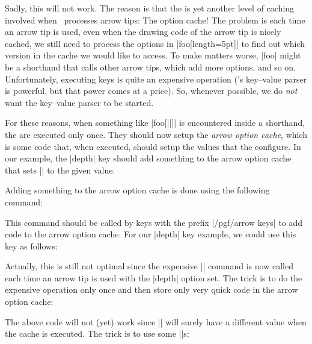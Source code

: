 Sadly, this will not work. The  reason is that the is
yet another level of caching involved when \pgfname\ processes arrow tips: The
option cache! The problem is each time an arrow tip is used, even when the
drawing code of the arrow tip is nicely cached, we still need to process the
options in |foo[length=5pt]| to find out which version in the cache we would
like to access. To make matters worse, |foo| might be a shorthand that calls
other arrow tips, which add more options, and so on. Unfortunately, executing
keys is quite an expensive operation (\pgfname's key--value parser is powerful,
but that power comes at a price). So, whenever possible, we do \emph{not} want
the key--value parser to be started.

For these reasons, when something like |foo[||]| is encountered
inside a shorthand, the  are executed only once. They should now
setup the \emph{arrow option cache}, which is some code that, when executed,
should setup the values that the  configure. In our example, the
|depth| key should add something to the arrow option cache that sets
|\pgfarrowdepth| to the given value.

Adding something to the arrow option cache is done using the following command:

\begin{command}{\pgfarrowsaddtooptions{}}
    This command should be called by keys with the prefix |/pgf/arrow keys| to
    add code to the arrow option cache. For our |depth| key example, we could
    use this key as follows:
\begin{codeexample}[code only]
\pgfkeys{/pgf/arrow keys/depth/.code=
  \pgfarrowsaddtooptions{\pgfmathsetlength{\pgfarrowdepth}{#1}}
\end{codeexample}
    Actually, this is still not optimal since the expensive |\pgfmathsetlength|
    command is now called each time an arrow tip is used with the |depth|
    option set. The trick is to do the expensive operation only once and then
    store only very quick code in the arrow option cache:
\begin{codeexample}[code only]
\pgfkeys{/pgf/arrow keys/depth/.code=
  \pgfmathsetlength{\somedimen}{#1}
  \pgfarrowsaddtooptions{\pgfarrowdepth=\somedimen} %
\end{codeexample}
    The above code will not (yet) work since |\somedimen| will surely have a
    different value when the cache is executed. The trick is to use some
    |\expandafter|s:
\begin{codeexample}[code only]
\pgfkeys{/pgf/arrow keys/depth/.code=
  \pgfmathsetlength{\somedimen}{#1}
  \expandafter\pgfarrowsaddtooptions\expandafter{\expandafter\pgfarrowdepth\expandafter=\the\somedimen}
\end{codeexample}
\end{command}

